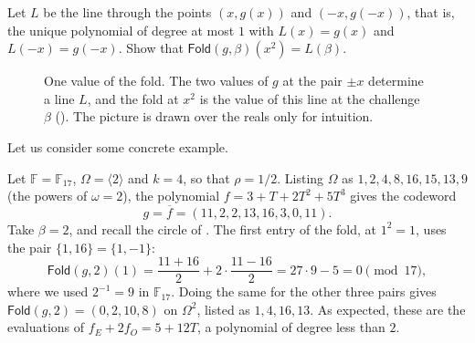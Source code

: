 \documentclass[../../book]{subfiles}
\begin{document}
\begin{exercise}\label{ex:fri-line}
    Let $L$ be the line through the points $(x, g(x))$ and $(-x, g(-x))$, that is, the unique polynomial of degree at most $1$ with $L(x) = g(x)$ and $L(-x) = g(-x)$.
    Show that $\mathsf{Fold}(g, \beta)(x^2) = L(\beta)$.
\end{exercise}

\begin{figure}[ht]
    \centering
    \caption{One value of the fold. The two values of $g$ at the pair $\pm x$ determine a line $L$, and the fold at $x^2$ is the value of this line at the challenge $\beta$ (). The picture is drawn over the reals only for intuition.}
    \label{fig:fri-fold-line}
\end{figure}

Let us consider some concrete example.

\begin{example}\label{ex:fri-fold}
    Let $\mathbb{F} = \mathbb{F}_{17}$, $\Omega = \langle 2 \rangle$ and $k = 4$, so that $\rho = 1/2$.
    Listing $\Omega$ as $1, 2, 4, 8, 16, 15, 13, 9$ (the powers of $\omega = 2$), the polynomial $f = 3 + T + 2T^2 + 5T^3$ gives the codeword
    \begin{equation*}
        g = \overline{f} = (11, 2, 2, 13, 16, 3, 0, 11).
    \end{equation*}
    Take $\beta = 2$, and recall the circle of .
    The first entry of the fold, at $1^2 = 1$, uses the pair $\{1, 16\} = \{1, -1\}$:
    \begin{equation*}
        \mathsf{Fold}(g, 2)(1) = \frac{11 + 16}{2} + 2 \cdot \frac{11 - 16}{2} = 27 \cdot 9 - 5 = 0 \pmod{17},
    \end{equation*}
    where we used $2^{-1} = 9$ in $\mathbb{F}_{17}$.
    Doing the same for the other three pairs gives $\mathsf{Fold}(g, 2) = (0, 2, 10, 8)$ on $\Omega^2$, listed as $1, 4, 16, 13$.
    As expected, these are the evaluations of $f_E + 2 f_O = 5 + 12T$, a polynomial of degree less than $2$.
\end{example}
\end{document}
